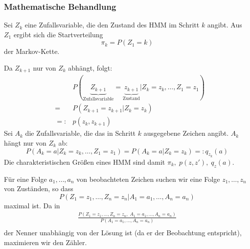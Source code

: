 \subsubsection{Mathematische Behandlung}
Sei \(Z_k\) eine Zufallsvariable, die den Zustand des HMM im Schritt \(k\) angibt.
Aus \(Z_1\) ergibt sich die Startverteilung \[\pi_k=P(Z_1=k)\] der Markov-Kette.

Da \(Z_{k+1}\) nur von \(Z_k\) abhängt, folgt:
\begin{eqnarray*}
	&&P(\underbrace{Z_{k+1}}_{\text{Zufallsvariable}}=\underbrace{z_{k+1}}_{\text{Zustand}}|Z_k=z_k,\dots,Z_1=z_1)\\
	&=& P(Z_{k+1}=z_{k+1}|Z_k=z_k)\\
	&=:& p(z_k,z_{k+1})
\end{eqnarray*}
Sei \(A_k\) die Zufallsvariable, die das in Schritt \(k\) ausgegebene Zeichen angibt.
\(A_k\) hängt nur von \(Z_k\) ab:
\[P(A_k=a|Z_k=z_k,\dots,Z_1=z_1) = P(A_k=a|Z_k=z_k) =: q_{z_k}(a)\]
Die charakteristischen Größen eines HMM sind damit \(\pi_k,\; p(z,z'),\; q_z(a)\).

Für eine Folge \(a_1,\dots,a_n\) von beobachteten Zeichen suchen wir eine Folge \(z_1,\dots,z_n\) von Zuständen, so dass
\[P(Z_1=z_1,\dots,Z_n=z_n|A_1=a_1,\dots,A_n=a_n)\]
maximal ist.
Da in
\begin{eqnarray*}
    \frac{P(Z_1=z_1, \dots, Z_n=z_n,\; A_1 = a_1, \dots, A_n=a_n)}{P(A_1=a_1, \dots, A_n=a_n)} \\
\end{eqnarray*}
der Nenner unabhängig von der Lösung ist (da er der Beobachtung entspricht), maximieren wir den Zähler.

